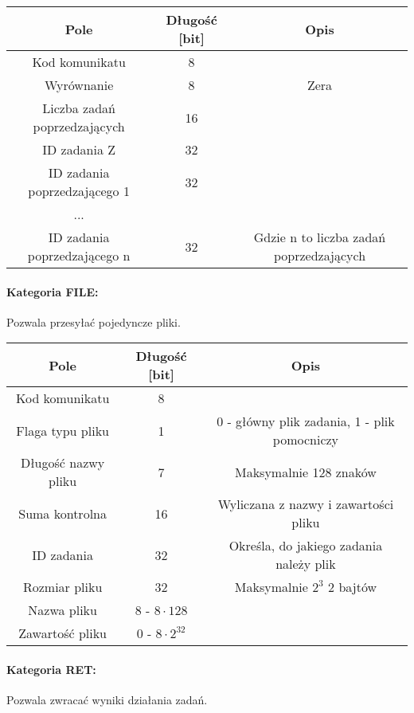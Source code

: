 \documentclass[10pt,a4paper]{article}
\begin{document}
            \begin{tabular}{ c | c | c }
			    \textbf{Pole} & \textbf{Długość [bit]} & \textbf{Opis} \\
			    \hline
			    Kod komunikatu & 8 & \\
			    Wyrównanie & 8 & Zera \\
			    Liczba zadań poprzedzających & 16 & \\
			    ID zadania Z & 32 & \\
			    ID zadania poprzedzającego 1 & 32 & \\
			    ... &  &  \\
			    ID zadania poprzedzającego n & 32 & Gdzie n to liczba zadań poprzedzających \\
			\end{tabular}
			
			\paragraph{Kategoria FILE:\\}
            Pozwala przesyłać pojedyncze pliki.
            
            \begin{tabular}{ c | c | c }
			    \textbf{Pole} & \textbf{Długość [bit]} & \textbf{Opis} \\
			    \hline
			    Kod komunikatu & 8 & \\
			    Flaga typu pliku & 1 & 0 - główny plik zadania, 1 - plik pomocniczy \\
			    Długość nazwy pliku & 7 & Maksymalnie 128 znaków \\
			    Suma kontrolna & 16 & Wyliczana z nazwy i zawartości pliku \\
			    ID zadania & 32 & Określa, do jakiego zadania należy plik \\
			    Rozmiar pliku & 32 & Maksymalnie $ 2^{3} $ 2 bajtów \\
			    Nazwa pliku & 8 - $ 8 \cdot 128 $ &  \\
			    Zawartość pliku & 0 - $ 8 \cdot 2^{32} $ &  \\
			\end{tabular}
			
			\paragraph{Kategoria RET:\\}
            Pozwala zwracać wyniki działania zadań.
            
\end{document}
